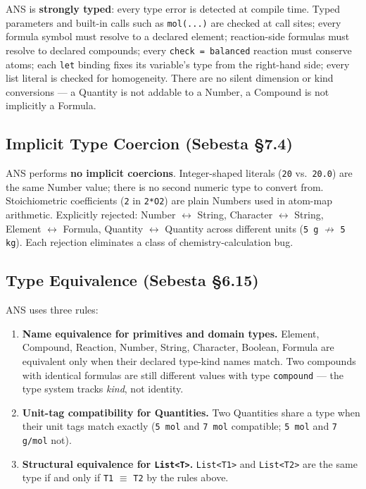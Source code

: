 \documentclass[11pt,a4paper]{article}
\newcommand{\code}[1]{\texttt{#1}}
\begin{document}
ANS is \textbf{strongly typed}: every type error is detected at compile time. Typed parameters and built-in calls such as \code{mol(...)} are checked at call sites; every formula symbol must resolve to a declared element; reaction-side formulas must resolve to declared compounds; every \code{check = balanced} reaction must conserve atoms; each \code{let} binding fixes its variable's type from the right-hand side; every list literal is checked for homogeneity. There are no silent dimension or kind conversions --- a Quantity is not addable to a Number, a Compound is not implicitly a Formula.

\subsection{Implicit Type Coercion (Sebesta \S7.4)}

ANS performs \textbf{no implicit coercions}. Integer-shaped literals (\code{20} vs.\ \code{20.0}) are the same Number value; there is no second numeric type to convert from. Stoichiometric coefficients (\code{2} in \code{2*O2}) are plain Numbers used in atom-map arithmetic. Explicitly rejected: Number $\leftrightarrow$ String, Character $\leftrightarrow$ String, Element $\leftrightarrow$ Formula, Quantity $\leftrightarrow$ Quantity across different units (\code{5 g} $\not\to$ \code{5 kg}). Each rejection eliminates a class of chemistry-calculation bug.

\subsection{Type Equivalence (Sebesta \S6.15)}

ANS uses three rules:
\begin{enumerate}[leftmargin=1.5em,itemsep=2pt]
\item \textbf{Name equivalence for primitives and domain types.} Element, Compound, Reaction, Number, String, Character, Boolean, Formula are equivalent only when their declared type-kind names match. Two compounds with identical formulas are still different values with type \code{compound} --- the type system tracks \emph{kind}, not identity.
\item \textbf{Unit-tag compatibility for Quantities.} Two Quantities share a type when their unit tags match exactly (\code{5 mol} and \code{7 mol} compatible; \code{5 mol} and \code{7 g/mol} not).
\item \textbf{Structural equivalence for \code{List<T>}.} \code{List<T1>} and \code{List<T2>} are the same type if and only if \code{T1} $\equiv$ \code{T2} by the rules above.
\end{enumerate}
\end{document}
